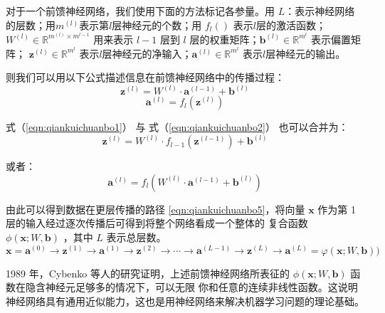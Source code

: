 对于一个前馈神经网络，我们使用下面的方法标记各参量。用 $L$：表示神经网络的层数；用$m^{(l)}$表示第$l$层神经元的个数；用
$f_l ()$ 表示$l$层的激活函数；$W ^ { ( l ) } \in \mathbb { R } ^ { m ^ { ( l ) } \times m ^ { l - 1 } }$ 用来表示
$l-1$ 层到 $l$ 层的权重矩阵；$\mathbf { b } ^ { ( l ) } \in \mathbb { R } ^ { m ^ { l } }$ 表示偏置矩阵；
$\mathbf { z } ^ { ( l ) } \in \mathbb { R } ^ { m ^ { l } }$ 表示$l$层神经元的净输入；$\mathbf { a } ^ { ( l ) } \in \mathbb { R } ^ { m ^ { l } }$
表示$l$层神经元的输出。

则我们可以用以下公式描述信息在前馈神经网络中的传播过程：
\begin{equation}
	\label{eqn:qiankuichuanbo1}
	\mathbf { z } ^ { ( l ) } = W ^ { ( l ) } \cdot \mathbf { a } ^ { ( l - 1 ) } + \mathbf { b } ^ { ( l ) }
\end{equation}
\begin{equation}
	\label{eqn:qiankuichuanbo2}
	\mathbf { a } ^ { ( l ) } = f _ { l } \left( \mathbf { z } ^ { ( l ) } \right)
\end{equation}

式（\ref{eqn:qiankuichuanbo1}） 与 式（\ref{eqn:qiankuichuanbo2}） 也可以合并为：
\begin{equation}
	\label{eqn:qiankuichuanbo3}
	\mathbf { z } ^ { ( l ) } = W ^ { ( l ) } \cdot f _ { l - 1 } \left( \mathbf { z } ^ { ( l - 1 ) } \right) + \mathbf { b } ^ { ( l ) }
\end{equation}

或者：
\begin{equation}
	\label{eqn:qiankuichuanbo4}
	\mathbf { a } ^ { ( l ) } = f _ { l } \left( W ^ { ( l ) } \cdot \mathbf { a } ^ { ( l - 1 ) } + \mathbf { b } ^ { ( l ) } \right)
\end{equation}

由此可以得到数据在更层传播的路径 \ref{eqn:qiankuichuanbo5}，将向量 $\mathbf{x}$ 作为第 1 层的输入经过逐次传播后可得到将整个网络看成一个整体的
复合函数 $\phi(\mathbf{x} ; W, \mathbf{b})$
，其中 $L$ 表示总层数。
\begin{equation}
	\label{eqn:qiankuichuanbo5}
	\mathbf{x}=\mathbf{a}^{(0)} \rightarrow \mathbf{z}^{(1)} \rightarrow \mathbf{a}^{(1)} \rightarrow \mathbf{z}^{(2)} \rightarrow \cdots \rightarrow \mathbf{a}^{(L-1)} \rightarrow \mathbf{z}^{(L)} \rightarrow \mathbf{a}^{(L)}=\varphi(\mathbf{x} ; W, \mathbf{b}) )
\end{equation}

1989 年，Cybenko 等人的研究证明\cite{cybenko1989approximation}，上述前馈神经网络所表征的 $\phi(\mathbf{x} ; W, \mathbf{b})$ 函数在隐含神经元足够多的情况下，可以无限
你和任意的连续非线性函数。这说明神经网络具有通用近似能力，这也是用神经网络来解决机器学习问题的理论基础。

